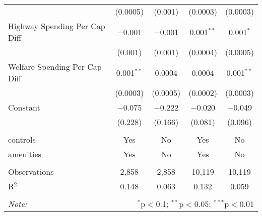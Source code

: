 \begin{table}[!htbp]
\begin{tabular}{@{\extracolsep{5pt}}lcccc}
  & (0.0005) & (0.001) & (0.0003) & (0.0003) \\ 
  Highway Spending Per Cap Diff & $-$0.001 & $-$0.001 & 0.001$^{**}$ & 0.001$^{*}$ \\ 
  & (0.001) & (0.001) & (0.0004) & (0.0005) \\ 
  Welfare Spending Per Cap Diff & 0.001$^{**}$ & 0.0004 & 0.0004 & 0.001$^{**}$ \\ 
  & (0.0003) & (0.0005) & (0.0002) & (0.0003) \\ 
  Constant & $-$0.075 & $-$0.222 & $-$0.020 & $-$0.049 \\ 
  & (0.228) & (0.166) & (0.081) & (0.096) \\ 
 \hline \\[-1.8ex] 
controls & Yes & No & Yes & No \\ 
amenities & Yes & No & Yes & No \\ 
\hline \\[-1.8ex] 
Observations & 2,858 & 2,858 & 10,119 & 10,119 \\ 
R$^{2}$ & 0.148 & 0.063 & 0.132 & 0.059 \\ 
\hline 
\hline \\[-1.8ex] 
\textit{Note:}  & \multicolumn{4}{r}{$^{*}$p$<$0.1; $^{**}$p$<$0.05; $^{***}$p$<$0.01} \\ 
\end{tabular} 
\end{table} 
